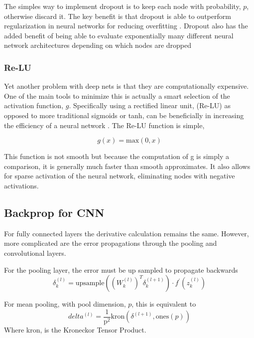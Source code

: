 \documentclass[12pt, twocolumn]{article}
\begin{document}
The simples way to implement dropout is to keep each node with probability, $p$, otherwise discard it. The key benefit is that dropout is able to outperform regularization in neural networks for reducing overfitting \cite{Dropout}. Dropout also has the added benefit of being able to evaluate exponentially many different neural network architectures depending on which nodes are dropped
 
\subsubsection{Re-LU}

Yet another problem with deep nets is that they are computationally expensive. One of the main tools to minimize this is actually a smart selection of the activation function, $g$. Specifically using a rectified linear unit, (Re-LU) as opposed to more traditional sigmoids or tanh, can be beneficially in increasing the efficiency of a neural network \cite{imagenet}. The Re-LU function is simple, 

\begin{equation}
g(x)= \textrm{max}(0,x)
\end{equation}

This function is not smooth but because the computation of g is simply a comparison, it is generally much faster than smooth approximates. It also allows for sparse activation of the neural network, eliminating nodes with negative activations. 

\subsection{Backprop for CNN}
For fully connected layers  the derivative calculation remains the same. However, more complicated are the error propagations through the pooling and convolutional layers. 

For the pooling layer, the error must be up sampled to propagate backwards
\begin{equation}
\delta^{(l)}_k=\textrm{upsample}((W^{(l)}_k)^T \delta^{(l+1)}_k) \cdot f^{\prime}(z^{(l)}_k)
\end{equation}


For mean pooling, with pool dimension, $p$, this is equivalent to 
\begin{equation}
delta^{(l)}= \frac{1}{\textrm{p}^2}  \textrm{kron}(\delta^{(l+1)}, \textrm{ones}(p))
\end{equation}
Where kron, is the Kroneckor Tensor Product.
\end{document}
